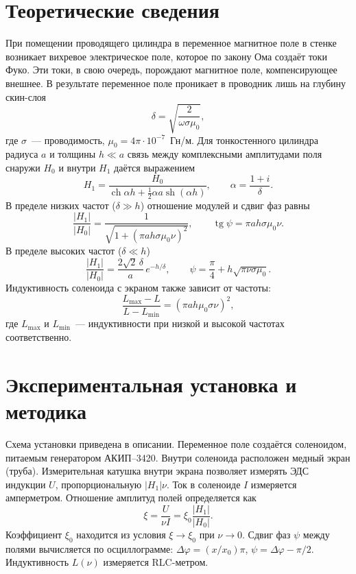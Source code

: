 \documentclass[a4paper,12pt]{article}
\begin{document}
\section{Теоретические сведения}
При помещении проводящего цилиндра в переменное магнитное поле в стенке возникает вихревое электрическое поле, которое по закону Ома создаёт токи Фуко. Эти токи, в свою очередь, порождают магнитное поле, компенсирующее внешнее. В результате переменное поле проникает в проводник лишь на глубину скин-слоя
\begin{equation}
    \delta = \sqrt{\frac{2}{\omega\sigma\mu_0}},
    \label{eq:delta}
\end{equation}
где $\sigma$~--- проводимость, $\mu_0=4\pi\cdot10^{-7}$~Гн/м. Для тонкостенного цилиндра радиуса $a$ и толщины $h\ll a$ связь между комплексными амплитудами поля снаружи $H_0$ и внутри $H_1$ даётся выражением
\begin{equation}
    H_1 = \frac{H_0}{\operatorname{ch}\alpha h + \frac{1}{2}\alpha a\operatorname{sh}(\alpha h)},
    \qquad \alpha = \frac{1+i}{\delta}.
    \label{eq:H1}
\end{equation}
В пределе низких частот ($\delta\gg h$) отношение модулей и сдвиг фаз равны
\begin{equation}
    \frac{|H_1|}{|H_0|} = \frac{1}{\sqrt{1+(\pi a h\sigma\mu_0\nu)^2}},
    \qquad \operatorname{tg}\psi = \pi a h\sigma\mu_0\nu.
    \label{eq:low}
\end{equation}
В пределе высоких частот ($\delta\ll h$)
\begin{equation}
    \frac{|H_1|}{|H_0|} = \frac{2\sqrt{2}\,\delta}{a}\,e^{-h/\delta},
    \qquad \psi = \frac{\pi}{4} + h\sqrt{\pi\nu\sigma\mu_0}.
    \label{eq:high}
\end{equation}
Индуктивность соленоида с экраном также зависит от частоты:
\begin{equation}
    \frac{L_{\max}-L}{L-L_{\min}} = (\pi a h\mu_0\sigma\nu)^2,
    \label{eq:L}
\end{equation}
где $L_{\max}$ и $L_{\min}$~--- индуктивности при низкой и высокой частотах соответственно.

\section{Экспериментальная установка и методика}
Схема установки приведена в описании. Переменное поле создаётся соленоидом, питаемым генератором АКИП--3420. Внутри соленоида расположен медный экран (труба). Измерительная катушка внутри экрана позволяет измерять ЭДС индукции $U$, пропорциональную $|H_1|\nu$. Ток в соленоиде $I$ измеряется амперметром. Отношение амплитуд полей определяется как
\begin{equation}
    \xi = \frac{U}{\nu I} = \xi_0 \frac{|H_1|}{|H_0|}.
\end{equation}
Коэффициент $\xi_0$ находится из условия $\xi\to\xi_0$ при $\nu\to0$. Сдвиг фаз $\psi$ между полями вычисляется по осциллограмме: $\Delta\varphi = (x/x_0)\pi$, $\psi = \Delta\varphi - \pi/2$. Индуктивность $L(\nu)$ измеряется RLC-метром.
\end{document}

